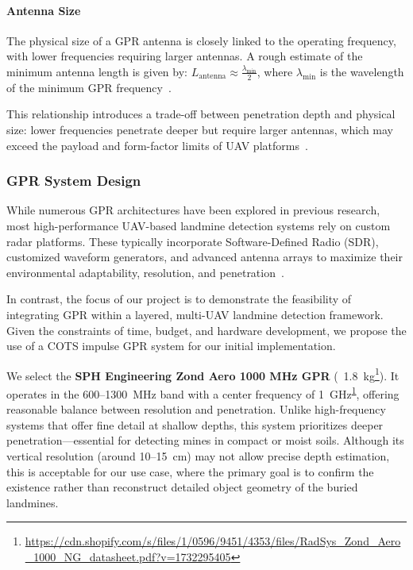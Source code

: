 \paragraph{Antenna Size}

The physical size of a GPR antenna is closely linked to the operating frequency, with lower frequencies requiring larger antennas. A rough estimate of the minimum antenna length is given by: \(L_{\text{antenna}} \approx \frac{\lambda_{\text{min}}}{2}\), where $\lambda_{\text{min}}$ is the wavelength of the minimum GPR frequency~\cite{burr2018design}.

This relationship introduces a trade-off between penetration depth and physical size: lower frequencies penetrate deeper but require larger antennas, which may exceed the payload and form-factor limits of UAV platforms~\cite{alqudsi2021review}.



\subsubsection{GPR System Design}

While numerous GPR architectures have been explored in previous research, most high-performance UAV-based landmine detection systems rely on custom radar platforms. These typically incorporate Software-Defined Radio (SDR), customized waveform generators, and advanced antenna arrays to maximize their environmental adaptability, resolution, and penetration~\cite{cerquera2017uav}.

In contrast, the focus of our project is to demonstrate the feasibility of integrating GPR within a layered, multi-UAV landmine detection framework. Given the constraints of time, budget, and hardware development, we propose the use of a COTS impulse GPR system for our initial implementation.

We select the \textbf{SPH Engineering Zond Aero 1000 MHz GPR} (~1.8~kg\footnote{\label{Zond}\url{https://cdn.shopify.com/s/files/1/0596/9451/4353/files/RadSys_Zond_Aero_1000_NG_datasheet.pdf?v=1732295405}}). It operates in the 600–1300~MHz band with a center frequency of 1~GHz\textsuperscript{\ref{Zond}}, offering reasonable balance between resolution and penetration. Unlike high-frequency systems that offer fine detail at shallow depths, this system prioritizes deeper penetration—essential for detecting mines in compact or moist soils. Although its vertical resolution (around 10--15~cm) may not allow precise depth estimation, this is acceptable for our use case, where the primary goal is to confirm the existence rather than reconstruct detailed object geometry of the buried landmines.

